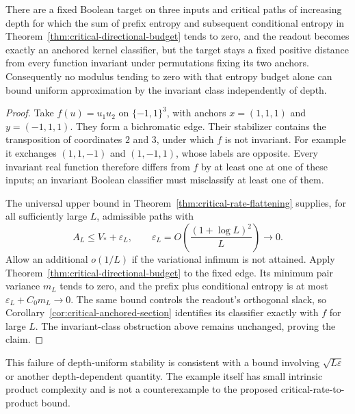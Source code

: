 \begin{corollary}
\label{cor:critical-no-uniform-orbit-stability}
There are a fixed Boolean target on three inputs and critical paths of
increasing depth for which the sum of prefix entropy and subsequent
conditional entropy in
Theorem~\ref{thm:critical-directional-budget} tends to zero, and the
readout becomes exactly an anchored kernel classifier, but the target
stays a fixed positive distance from every function invariant under
permutations fixing its two anchors. Consequently no modulus tending
to zero with that entropy budget alone can bound uniform approximation
by the invariant class independently of depth.
\end{corollary}

\begin{proof}
Take $f(u)=u_1u_2$ on $\{-1,1\}^3$, with anchors
$x=(1,1,1)$ and $y=(-1,1,1)$. They form a bichromatic edge.
Their stabilizer contains the transposition of coordinates $2$ and
$3$, under which $f$ is not invariant. For example it exchanges
$(1,1,-1)$ and $(1,-1,1)$, whose labels are opposite.
Every invariant real function therefore differs from $f$ by at least
one at one of these inputs; an invariant Boolean classifier must
misclassify at least one of them.

The universal upper bound in
Theorem~\ref{thm:critical-rate-flattening} supplies, for all sufficiently
large $L$, admissible paths with
\[
 A_L\le V_*+\varepsilon_L,
 \qquad \varepsilon_L=O\!\left(\frac{(1+\log L)^2}{L}\right)
                  \longrightarrow0.
\]
Allow an additional $o(1/L)$ if the variational infimum is not attained.
Apply Theorem~\ref{thm:critical-directional-budget} to the fixed edge.
Its minimum pair variance $m_L$ tends to zero, and the prefix plus
conditional entropy is at most $\varepsilon_L+C_0m_L\to0$.
The same bound controls the readout's orthogonal slack, so
Corollary~\ref{cor:critical-anchored-section} identifies its classifier
exactly with $f$ for large $L$. The invariant-class obstruction above
remains unchanged, proving the claim.
\end{proof}

This failure of depth-uniform stability is consistent with a bound
involving $\sqrt{L\varepsilon}$ or another depth-dependent quantity.
The example itself has small intrinsic product complexity and is not a
counterexample to the proposed critical-rate-to-product bound.
